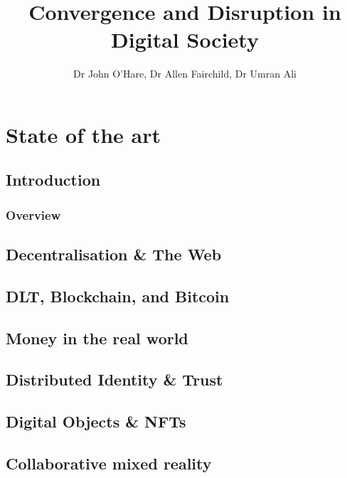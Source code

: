 \documentclass[10pt, a5paper]{book}
\begin{document}
\title{Convergence and Disruption in Digital Society}
\author{Dr John O'Hare, Dr Allen Fairchild, Dr Umran Ali}
\date{}

\maketitle

\part{State of the art}

\chapter{Introduction}
\section{Overview}



\chapter{Decentralisation \& The Web}


\chapter{DLT, Blockchain, and Bitcoin}


\chapter{Money in the real world}


\chapter{Distributed Identity \& Trust}


\chapter{Digital Objects \& NFTs}


\chapter{Collaborative mixed reality}


\end{document}
